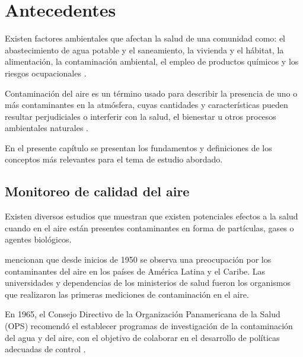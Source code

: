 \chapter{Antecedentes}
Existen factores ambientales que afectan la salud de una comunidad como: el abastecimiento de agua potable y el saneamiento, la vivienda y el hábitat, la alimentación, la contaminación ambiental, el empleo de productos químicos y los riesgos ocupacionales \citep{r2}. 

Contaminación del aire es un término usado para describir la presencia de uno o más contaminantes en la atmósfera, cuyas cantidades y características pueden resultar perjudiciales o interferir con la salud, el bienestar u otros procesos ambientales naturales \citep{r3}.

En el presente capítulo se presentan los fundamentos y definiciones de los conceptos más relevantes para el tema de estudio abordado.

\section{Monitoreo de calidad del aire}
Existen diversos estudios que muestran que existen potenciales efectos a la salud cuando en el aire están presentes contaminantes en forma de partículas, gases o agentes biológicos.

\citet{r4} mencionan que desde inicios de 1950 se observa una preocupación por los contaminantes del aire  en los países de América Latina y el Caribe. Las universidades y dependencias de los ministerios de salud fueron los organismos que realizaron las primeras mediciones de contaminación en el aire.

En 1965, el Consejo Directivo de la Organización Panamericana de la Salud (OPS) recomendó el establecer programas de investigación de la contaminación del agua y del aire, con el objetivo de colaborar en el desarrollo de políticas adecuadas de control \citep{r5}.


